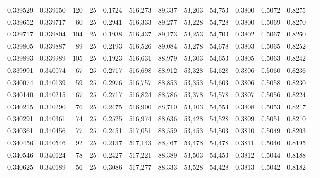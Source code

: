 \begin{tabular}{rrrrrrrrrrrrr}
0.339529 & 0.339650 &   120 &  25 &                                     0.1724 & 516,273 &  89,337 &  53,203 &  54,753 & 0.3800 & 0.5072 & 0.8275 \\
0.339652 & 0.339717 &    60 &  25 &                                     0.2941 & 516,333 &  89,277 &  53,228 &  54,728 & 0.3800 & 0.5069 & 0.8270 \\
0.339717 & 0.339804 &   104 &  25 &                                     0.1938 & 516,437 &  89,173 &  53,253 &  54,703 & 0.3802 & 0.5067 & 0.8260 \\
0.339805 & 0.339887 &    89 &  25 &                                     0.2193 & 516,526 &  89,084 &  53,278 &  54,678 & 0.3803 & 0.5065 & 0.8252 \\
0.339893 & 0.339989 &   105 &  25 &                                     0.1923 & 516,631 &  88,979 &  53,303 &  54,653 & 0.3805 & 0.5063 & 0.8242 \\
0.339991 & 0.340074 &    67 &  25 &                                     0.2717 & 516,698 &  88,912 &  53,328 &  54,628 & 0.3806 & 0.5060 & 0.8236 \\
0.340074 & 0.340139 &    59 &  25 &                                     0.2976 & 516,757 &  88,853 &  53,353 &  54,603 & 0.3806 & 0.5058 & 0.8230 \\
0.340140 & 0.340215 &    67 &  25 &                                     0.2717 & 516,824 &  88,786 &  53,378 &  54,578 & 0.3807 & 0.5056 & 0.8224 \\
0.340215 & 0.340290 &    76 &  25 &                                     0.2475 & 516,900 &  88,710 &  53,403 &  54,553 & 0.3808 & 0.5053 & 0.8217 \\
0.340291 & 0.340361 &    74 &  25 &                                     0.2525 & 516,974 &  88,636 &  53,428 &  54,528 & 0.3809 & 0.5051 & 0.8210 \\
0.340361 & 0.340456 &    77 &  25 &                                     0.2451 & 517,051 &  88,559 &  53,453 &  54,503 & 0.3810 & 0.5049 & 0.8203 \\
0.340456 & 0.340546 &    92 &  25 &                                     0.2137 & 517,143 &  88,467 &  53,478 &  54,478 & 0.3811 & 0.5046 & 0.8195 \\
0.340546 & 0.340624 &    78 &  25 &                                     0.2427 & 517,221 &  88,389 &  53,503 &  54,453 & 0.3812 & 0.5044 & 0.8188 \\
0.340625 & 0.340689 &    56 &  25 &                                     0.3086 & 517,277 &  88,333 &  53,528 &  54,428 & 0.3813 & 0.5042 & 0.8182 \\

\end{tabular}
